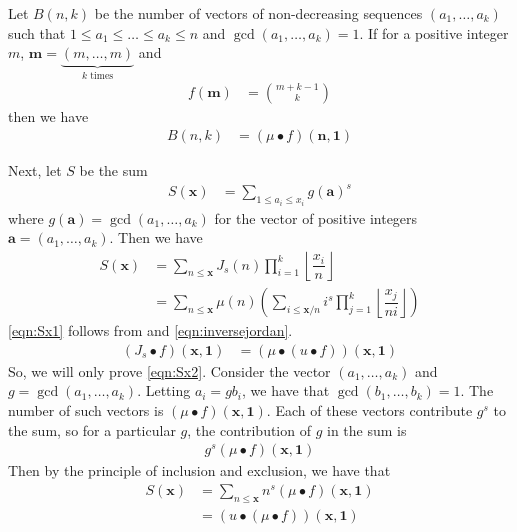 \documentclass[elemannt.tex]{subfile}
\begin{document}
	Let $B(n,k)$ be the number of vectors of non-decreasing sequences $(a_{1},\ldots,a_{k})$ such that $1\leq a_{1}\leq\ldots\leq a_{k}\leq n$ and $\gcd(a_{1},\ldots,a_{k})=1$. If for a positive integer $m$, $\mathbf{m}=\underbrace{(m,\ldots,m)}_{k\mbox{ times}}$ and
		\begin{align*}
			f(\mathbf{m})
				& = \binom{m+k-1}{k}
		\end{align*}
	then we have
		\begin{align*}
			B(n,k)
				& = (\mu\bullet f)(\mathbf{n},\mathbf{1})
		\end{align*}

	Next, let $S$ be the sum
		\begin{align*}
			S(\mathbf{x})
				& = \sum_{1\leq a_i\leq x_i}g(\mathbf{a})^{s}
		\end{align*}
	where $g(\mathbf{a})=\gcd(a_{1},\ldots,a_{k})$ for the vector of positive integers $\mathbf{a}=(a_{1},\ldots,a_{k})$. Then we have
		\begin{align}
			S(\mathbf{x})
				& = \sum_{n\leq\mathbf{x}}J_{s}(n)\prod_{i=1}^{k}\left\lfloor\dfrac{x_i}{n}\right\rfloor\label{eqn:Sx1}\\
				& = \sum_{n\leq\mathbf{x}}\mu(n)\left(\sum_{i\leq\mathbf{x}/n}i^{s}\prod_{j=1}^{k}\left\lfloor\dfrac{x_j}{ni}\right\rfloor\right)\label{eqn:Sx2}
		\end{align}
	\eqref{eqn:Sx1} follows from  and \eqref{eqn:inversejordan}.
		\begin{align*}
			(J_{s}\bullet f)(\mathbf{x},\mathbf{1})
				& = (\mu\bullet (u\bullet f))(\mathbf{x},\mathbf{1})
		\end{align*}
	So, we will only prove \eqref{eqn:Sx2}. Consider the vector $(a_{1},\ldots,a_{k})$ and $g=\gcd(a_{1},\ldots,a_{k})$. Letting $a_i=gb_i$, we have that $\gcd(b_{1},\ldots,b_{k})=1$. The number of such vectors is $(\mu\bullet f)(\mathbf{x},\mathbf{1})$. Each of these vectors contribute $g^{s}$ to the sum, so for a particular $g$, the contribution of $g$ in the sum is
		\begin{align*}
			g^{s}(\mu\bullet f)(\mathbf{x},\mathbf{1})
		\end{align*}
	Then by the principle of inclusion and exclusion, we have that
		\begin{align*}
			S(\mathbf{x})
				& = \sum_{n\leq\mathbf{x}}n^{s}(\mu\bullet f)(\mathbf{x},\mathbf{1})\\
				& = (u\bullet(\mu\bullet f))(\mathbf{x},\mathbf{1})
		\end{align*}
		
\end{document}
